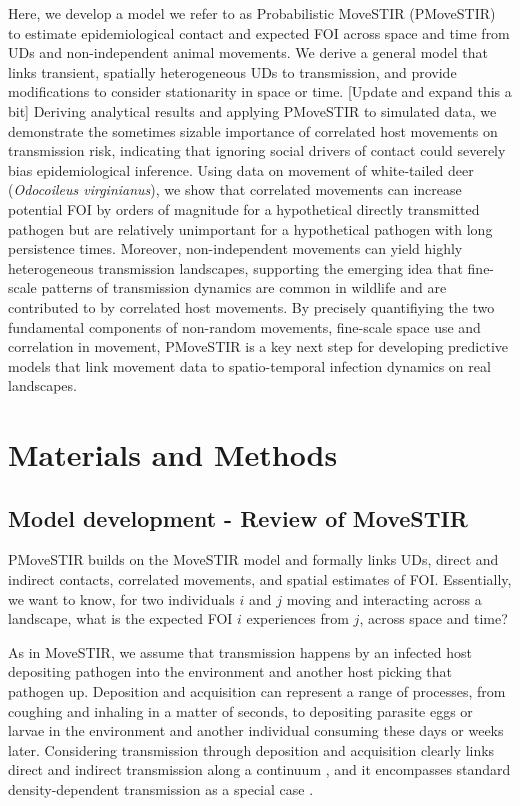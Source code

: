 \documentclass[letterpaper]{article}
\begin{document}
Here, we develop a model we refer to as Probabilistic MoveSTIR (PMoveSTIR) to estimate epidemiological contact and expected FOI across space and time from UDs and non-independent animal movements. We derive a general model that links transient, spatially heterogeneous UDs to transmission, and provide modifications to consider stationarity in space or time. [Update and expand this a bit]
Deriving analytical results and applying PMoveSTIR to simulated data, we demonstrate the sometimes sizable importance of correlated host movements on transmission risk, indicating that ignoring social drivers of contact could severely bias epidemiological inference. Using data on movement of white-tailed deer (\emph{Odocoileus virginianus}), we show that correlated movements can increase potential FOI by orders of magnitude for a hypothetical directly transmitted pathogen but are relatively unimportant for a hypothetical pathogen with long persistence times. Moreover, non-independent movements can yield highly heterogeneous transmission landscapes, supporting the emerging idea that fine-scale patterns of transmission dynamics are common in wildlife \citep{Albery2021} and are contributed to by correlated host movements. By precisely quantifiying the two fundamental components of non-random movements, fine-scale space use and correlation in movement, PMoveSTIR is a key next step for developing predictive models that link movement data to spatio-temporal infection dynamics on real landscapes.


\section*{Materials and Methods}

\subsection*{Model development - Review of MoveSTIR}

PMoveSTIR builds on the MoveSTIR model \citep{Wilber2022} and formally links UDs, direct and indirect contacts, correlated movements, and spatial estimates of FOI. Essentially, we want to know, for two individuals $i$ and $j$ moving and interacting across a landscape, what is the expected FOI $i$ experiences from $j$, across space and time? 

As in MoveSTIR, we assume that transmission happens by an infected host depositing pathogen into the environment and another host picking that pathogen up. 
Deposition and acquisition can represent a range of processes, from coughing and inhaling in a matter of seconds, to depositing parasite eggs or larvae in the environment and another individual consuming these days or weeks later. 
Considering transmission through deposition and acquisition clearly links direct and indirect transmission along a continuum \citep{Wilber2022}, and it encompasses standard density-dependent transmission as a special case \citep{Cortez2021}. 
\end{document}
